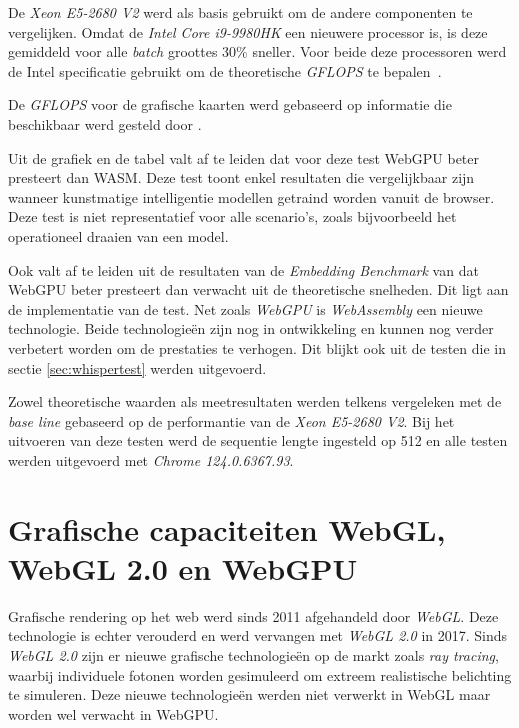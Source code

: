 De \textit{Xeon E5-2680 V2} werd als basis gebruikt om de andere componenten te vergelijken. Omdat de \textit{Intel Core i9-9980HK} een nieuwere processor is, is deze gemiddeld voor alle \textit{batch} groottes 30\% sneller. Voor beide deze processoren werd de Intel specificatie gebruikt om de theoretische \textit{GFLOPS} te bepalen~\autocite{Intel2024, Intel2024a}.

\bigbreak{}

De \textit{GFLOPS} voor de grafische kaarten werd gebaseerd op informatie die beschikbaar werd gesteld door \textcite{TechPowerUp2017, TechPowerUp2017a}.

\bigbreak{}

Uit de grafiek en de tabel valt af te leiden dat voor deze test WebGPU beter presteert dan WASM. Deze test toont enkel resultaten die vergelijkbaar zijn wanneer kunstmatige intelligentie modellen getraind worden vanuit de browser. Deze test is niet representatief voor alle scenario's, zoals bijvoorbeeld het operationeel draaien van een model.

\bigbreak{}

Ook valt af te leiden uit de resultaten van de \textit{Embedding Benchmark} van \textcite{Lochner2024} dat WebGPU beter presteert dan verwacht uit de theoretische snelheden. Dit ligt aan de implementatie van de test. Net zoals \textit{WebGPU} is \textit{WebAssembly} een nieuwe technologie. Beide technologieën zijn nog in ontwikkeling en kunnen nog verder verbetert worden om de prestaties te verhogen. Dit blijkt ook uit de testen die in sectie \ref{sec:whispertest} werden uitgevoerd.

\bigbreak{}

Zowel theoretische waarden als meetresultaten werden telkens vergeleken met de \textit{base line} gebaseerd op de performantie van de \textit{Xeon E5-2680 V2}. Bij het uitvoeren van deze testen werd de sequentie lengte ingesteld op 512 en alle testen werden uitgevoerd met \emph{Chrome 124.0.6367.93}.

\break{}

\section{Grafische capaciteiten WebGL, WebGL 2.0 en WebGPU}

Grafische rendering op het web werd sinds 2011 afgehandeld door \textit{WebGL}. Deze technologie is echter verouderd en werd vervangen met \textit{WebGL 2.0} in 2017. Sinds \textit{WebGL 2.0} zijn er nieuwe grafische technologieën op de markt zoals \textit{ray tracing}, waarbij individuele fotonen worden gesimuleerd om extreem realistische belichting te simuleren. Deze nieuwe technologieën werden niet verwerkt in WebGL maar worden wel verwacht in WebGPU.

